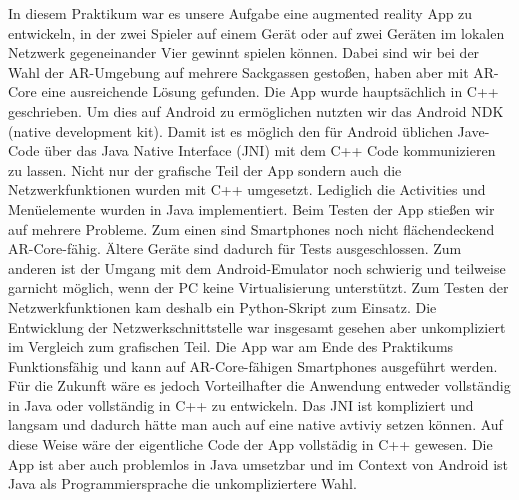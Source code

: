 In diesem Praktikum war es unsere Aufgabe eine augmented reality App zu entwickeln,
in der zwei Spieler auf einem Gerät oder auf zwei Geräten im lokalen Netzwerk gegeneinander
Vier gewinnt spielen können. Dabei sind wir bei der Wahl der AR-Umgebung auf mehrere Sackgassen
gestoßen, haben aber mit AR-Core eine ausreichende Lösung gefunden. Die App wurde hauptsächlich in C++ geschrieben.
Um dies auf Android zu ermöglichen nutzten wir das Android NDK (native development kit). Damit ist es möglich
den für Android üblichen Jave-Code über das Java Native Interface (JNI) mit dem C++ Code kommunizieren
zu lassen. Nicht nur der grafische Teil der App sondern auch die Netzwerkfunktionen wurden mit C++ umgesetzt.
Lediglich die Activities und Menüelemente wurden in Java implementiert.
Beim Testen der App stießen wir auf mehrere Probleme. Zum einen sind Smartphones noch nicht flächendeckend
AR-Core-fähig. Ältere Geräte sind dadurch für Tests ausgeschlossen. Zum anderen ist der Umgang mit dem Android-Emulator
noch schwierig und teilweise garnicht möglich, wenn der PC keine Virtualisierung unterstützt.
Zum Testen der Netzwerkfunktionen kam deshalb ein Python-Skript zum Einsatz.
Die Entwicklung der Netzwerkschnittstelle war insgesamt gesehen aber unkompliziert im Vergleich zum grafischen Teil.
Die App war am Ende des Praktikums Funktionsfähig und kann auf AR-Core-fähigen Smartphones ausgeführt werden.
Für die Zukunft wäre es jedoch Vorteilhafter die Anwendung entweder vollständig in Java oder vollständig in C++
zu entwickeln. Das JNI ist kompliziert und langsam und dadurch hätte man auch auf eine native avtiviy setzen können.
Auf diese Weise wäre der eigentliche Code der App vollstädig in C++ gewesen. Die App ist aber auch
problemlos in Java umsetzbar und im Context von Android ist Java als Programmiersprache die unkompliziertere Wahl.